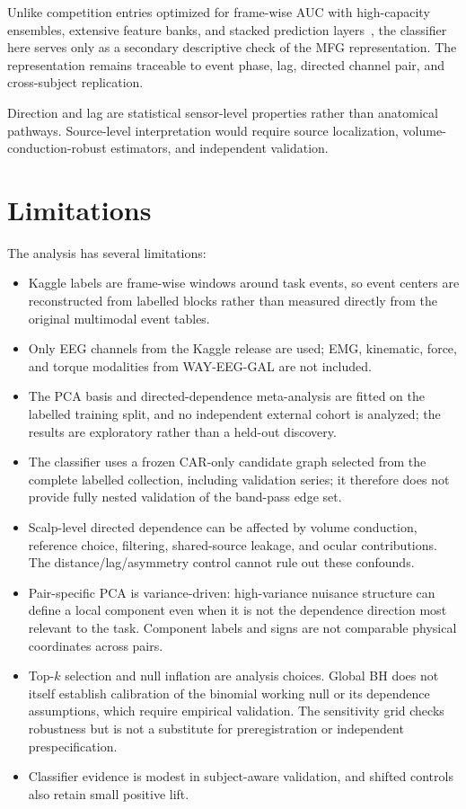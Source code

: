 \documentclass[10pt,journal]{IEEEtran}
\begin{document}
Unlike competition entries optimized for frame-wise AUC with high-capacity ensembles, extensive feature banks, and stacked prediction layers~\cite{barachant2015grasp}, the classifier here serves only as a secondary descriptive check of the MFG representation. The representation remains traceable to event phase, lag, directed channel pair, and cross-subject replication.

Direction and lag are statistical sensor-level properties rather than anatomical pathways. Source-level interpretation would require source localization, volume-conduction-robust estimators, and independent validation.

\section{Limitations}
The analysis has several limitations:
\begin{itemize}
    \item Kaggle labels are frame-wise windows around task events, so event centers are reconstructed from labelled blocks rather than measured directly from the original multimodal event tables.
    \item Only EEG channels from the Kaggle release are used; EMG, kinematic, force, and torque modalities from WAY-EEG-GAL are not included.
    \item The PCA basis and directed-dependence meta-analysis are fitted on the labelled training split, and no independent external cohort is analyzed; the results are exploratory rather than a held-out discovery.
    \item The classifier uses a frozen CAR-only candidate graph selected from the complete labelled collection, including validation series; it therefore does not provide fully nested validation of the band-pass edge set.
    \item Scalp-level directed dependence can be affected by volume conduction, reference choice, filtering, shared-source leakage, and ocular contributions. The distance/lag/asymmetry control cannot rule out these confounds.
    \item Pair-specific PCA is variance-driven: high-variance nuisance structure can define a local component even when it is not the dependence direction most relevant to the task. Component labels and signs are not comparable physical coordinates across pairs.
    \item Top-$k$ selection and null inflation are analysis choices. Global BH does not itself establish calibration of the binomial working null or its dependence assumptions, which require empirical validation. The sensitivity grid checks robustness but is not a substitute for preregistration or independent prespecification.
    \item Classifier evidence is modest in subject-aware validation, and shifted controls also retain small positive lift.
\end{itemize}
\end{document}
